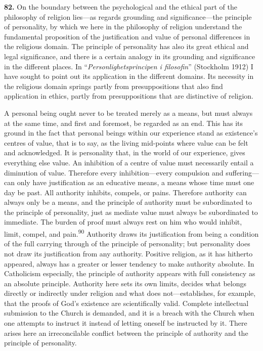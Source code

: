 \documentclass[12pt,a4paper]{book}
\newcommand{\opage}[1]{\marginnote{\footnotesize\textit{[#1]}}}
\begin{document}
\bigskip

\noindent\textbf{82.} On the boundary between the psychological and the ethical part of the
philosophy of religion lies---as regards grounding and significance---the principle of
personality, by which we here in the philosophy of religion understand the fundamental
proposition of the justification and value of personal differences in the religious domain. The
principle of personality has also its great ethical and legal significance, and there is a certain
analogy in its grounding and significance in the different places. In ``\emph{Personlighetsprincipen
i filosofin}'' (Stockholm 1912) I have sought to point out its application in the different
domains. Its necessity in the religious domain springs partly from presuppositions that also find
application in ethics, partly from presuppositions that are distinctive of religion.

A personal being ought never to be treated merely as a means, but must always at the same time,
and first and foremost, be regarded as an end. This has its ground in the fact that personal beings
within our experience stand as existence's centres of value, that is to say, as the living
mid-points where value can be felt and acknowledged. It is personality that, in the world of our
experience, gives everything else value. An inhibition of a centre of value must necessarily entail
a diminution of value. Therefore every inhibition---every compulsion and suffering---can only have
justification as an educative means, a means whose time must one day be past. All authority
inhibits, compels, or pains. Therefore authority can always only be a means, and the principle of
authority must be subordinated to the principle of personality, just as mediate value 
\opage{191}must always
be subordinated to immediate. The burden of proof must always rest on him who would inhibit, limit,
compel, and pain.\textsuperscript{90} Authority draws its justification from being a condition of
the full carrying through of the principle of personality; but personality does not draw its
justification from any authority. Positive religion, as it has hitherto appeared, always has a
greater or lesser tendency to make authority absolute. In Catholicism especially, the principle of
authority appears with full consistency as an absolute principle. Authority here sets its own limits,
decides what belongs directly or indirectly under religion and what does not---establishes, for
example, that the proofs of God's existence are scientifically valid. Complete intellectual
submission to the Church is demanded, and it is a breach with the Church when one attempts to instruct
it instead of letting oneself be instructed by it. There arises here an irreconcilable conflict
between the principle of authority and the principle of personality.
\end{document}
